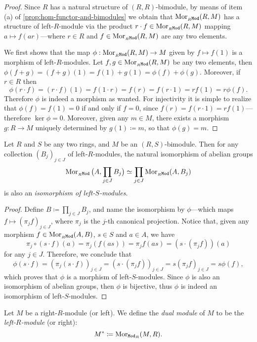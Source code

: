 \begin{proof}
Since \(R\) has a natural structure of \((R, R)\)-bimodule, by means of item (a)
of \cref{prop:hom-functor-and-bimodules} we obtain that
\(\operatorname{Mor}_{{{}_{R}\texttt{Mod}}}(R, M)\) has a structure of left-\(R\)-module via the product
\(r \cdot f \in \operatorname{Mor}_{{{}_{R}\texttt{Mod}}}(R, M)\) mapping \(a \mapsto f(a r)\)---where
\(r \in R\) and \(f \in \operatorname{Mor}_{{{}_{R}\texttt{Mod}}}(R, M)\) are any two elements.

We first shows that the map \(\phi: \operatorname{Mor}_{{{}_{R}\texttt{Mod}}}(R, M) \to M\) given by
\(f \mapsto f(1)\) is a morphism of left-\(R\)-modules. Let
\(f, g \in \operatorname{Mor}_{{{}_{R}\texttt{Mod}}}(R, M)\) be any two elements, then
\(\phi(f + g) = (f + g)(1) = f(1) + g(1) = \phi(f) + \phi(g)\). Moreover, if
\(r \in R\) then
\[
\phi(r \cdot f) = (r \cdot f)(1) = f(1 \cdot r)
= f(r) = f(r \cdot 1) = r f(1) = r \phi(f).
\]
Therefore \(\phi\) is indeed a morphism as wanted. For injectivity it is simple
to realize that \(\phi(f) = f(1) = 0\) if and only if \(f = 0\), since
\(f(r) = f(r \cdot 1) = r f(1)\)---therefore \(\ker \phi = 0\). Moreover, given
any \(m \in M\), there exists a morphism \(g: R \to M\) uniquely determined by
\(g(1) \coloneq m\), so that \(\phi(g) = m\).
\end{proof}

\begin{theorem}
\label{thm:iso-prod-bimodules-morphism-set}
Let \(R\) and \(S\) be any two rings, and \(M\) be an \((R, S)\)-bimodule. Then
for any collection \((B_j)_{j \in J}\) of left-\(R\)-modules, the natural
isomorphism of abelian groups
\[
\operatorname{Mor}_{{{}_{R}\texttt{Mod}}}\big(A, \prod_{j \in J} B_j\big)
\simeq
\prod_{j \in J} \operatorname{Mor}_{{{}_{R}\texttt{Mod}}}(A, B_j)
\]
is also an \emph{isomorphism of left-\(S\)-modules}.
\end{theorem}

\begin{proof}
Define \(B \coloneq \prod_{j \in J} B_j\), and name the isomorphism by
\(\phi\)---which maps \(f \mapsto (\pi_j f)_{j \in J}\), where \(\pi_j\) is the
\(j\)-th canonical projection. Notice that, given any morphism \(f \in
\operatorname{Mor}_{{{}_{R}\texttt{Mod}}}(A, B)\), \(s \in S\) and \(a \in A\), we have
\[
\pi_j \circ (s \cdot f)(a) = \pi_j(f(a s))
= \pi_j f(a s) = (s \cdot (\pi_j f))(a)
\]
for any \(j \in J\). Therefore, we conclude that
\[
\phi(s \cdot f) = (\pi_j(s \cdot f))_{j \in J} = (s \cdot (\pi_j f))_{j \in J}
= s (\pi_j f)_{j \in J} = s \phi(f),
\]
which proves that \(\phi\) is a morphism of left-\(S\)-modules. Since \(\phi\)
is also an isomorphism of abelian groups, then \(\phi\) is bijective, thus
\(\phi\) is indeed an isomorphism of left-\(S\)-modules.
\end{proof}

\begin{definition}
\label{def:dual-module}
Let \(M\) be a right-\(R\)-module (or left). We define
the \emph{dual module} of \(M\) to be the \emph{left-\(R\)-module}
(or right):
\[
M^{*} \coloneq \operatorname{Mor}_{{\texttt{Mod}_{R}}}(M, R).
\]
\end{definition}

